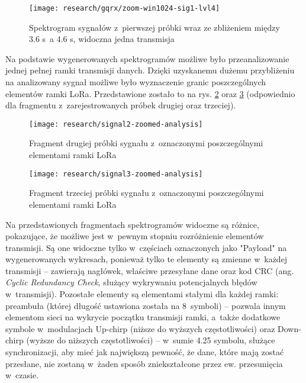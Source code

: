 \begin{figure}[!htbp]
    \centering
    \texttt{[image: research/gqrx/zoom-win1024-sig1-lvl4]}
    \caption{\label{img:signal1-level4}Spektrogram sygnałów z~pierwszej próbki wraz ze zbliżeniem między 3.6 s~a 4.6 s,
        widoczna jedna transmisja}
\end{figure}

\FloatBarrier
Na podstawie wygenerowanych spektrogramów możliwe było przeanalizowanie jednej pełnej ramki transmisji danych. Dzięki
uzyskanemu dużemu przybliżeniu na analizowany sygnał możliwe było wyznaczenie granic poszczególnych elementów ramki
LoRa. Przedstawione zostało to na rys. \ref{img:signal2-zoomed-analysis} oraz \ref{img:signal3-zoomed-analysis}
(odpowiednio dla fragmentu z~zarejestrowanych próbek drugiej oraz trzeciej).

\begin{figure}[!htbp]
    \centering
    \texttt{[image: research/signal2-zoomed-analysis]}
    \caption{\label{img:signal2-zoomed-analysis}Fragment drugiej próbki sygnału z~oznaczonymi poszczególnymi elementami
        ramki LoRa}
\end{figure}

\begin{figure}[!htbp]
    \centering
    \texttt{[image: research/signal3-zoomed-analysis]}
    \caption{\label{img:signal3-zoomed-analysis}Fragment trzeciej próbki sygnału z~oznaczonymi poszczególnymi elementami
        ramki LoRa}
\end{figure}

\FloatBarrier
Na przedstawionych fragmentach spektrogramów widoczne są różnice, pokazujące, że możliwe jest w~pewnym stopniu
rozróżnienie elementów transmisji. Są one widoczne tylko w~częściach oznaczonych jako "Payload" na wygenerowanych
wykresach, ponieważ tylko te elementy są zmienne w~każdej transmisji -- zawierają nagłówek, właściwe przesyłane dane
oraz kod CRC (ang. \textsl{Cyclic Redundancy Check}, służący wykrywaniu potencjalnych błędów w~transmisji). Pozostałe
elementy są elementami stałymi dla każdej ramki: preambuła (której długość ustawiona została na 8~symboli) -- pozwala
innym elementom sieci na wykrycie początku transmisji ramki, a~także dodatkowe symbole w~modulacjach Up-chirp (niższe do
wyższych częstotliwości) oraz Down-chirp (wyższe do niższych częstotliwości) -- w~sumie 4.25 symbolu, służące
synchronizacji, aby mieć jak największą pewność, że dane, które mają zostać przesłane, nie zostaną w~żaden sposób
zniekształcone przez ew. przesunięcia w~czasie.

